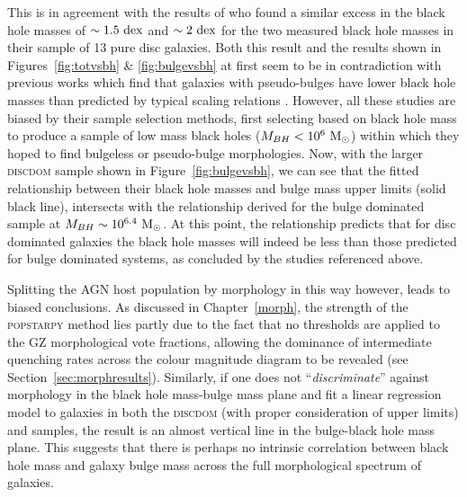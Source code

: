 {This is in agreement with the results of \citet{Simmons13} who found a similar excess in the black hole masses of $\sim 1.5~\rm{dex}$ and $\sim 2~\rm{dex}$ for the two measured black hole masses in their sample of 13 pure disc galaxies. Both this result and the results shown in Figures~\ref{fig:totvsbh} \& \ref{fig:bulgevsbh} at first seem to be in contradiction with previous works which find that galaxies with pseudo-bulges have lower black hole masses than predicted by typical scaling relations \citep[see work by][]{greene08, hu09, jiang11a, mathur12, ho14}. However, all these studies are biased by their sample selection methods, first selecting based on black hole mass to produce a sample of low mass black holes ($M_{BH} < 10^6 ~\rm{M}_{\odot}$) within which they hoped to find bulgeless or pseudo-bulge morphologies. Now, with the larger \textsc{discdom} sample shown in Figure~\ref{fig:bulgevsbh}, we can see that the fitted relationship between their black hole masses and bulge mass upper limits (solid black line), intersects with the relationship derived for the bulge dominated \citet{haringrix04} sample at $M_{BH} \sim 10^{6.4} ~\rm{M}_{\odot}$. At this point, the relationship predicts that for disc dominated galaxies the black hole masses will indeed be less than those predicted for bulge dominated systems, as concluded by the studies referenced above. 

Splitting the AGN host population by morphology in this way however, leads to biased conclusions. As discussed in Chapter~\ref{morph}, the strength of the \textsc{popstarpy} method lies partly due to the fact that no thresholds are applied to the GZ morphological vote fractions, allowing the dominance of intermediate quenching rates across the colour magnitude diagram to be revealed (see Section~\ref{sec:morphresults}). Similarly, if one does not ``\emph{discriminate}'' against morphology in the black hole mass-bulge mass plane and fit a linear regression model to galaxies in both the \textsc{discdom} (with proper consideration of upper limits) and \citet{haringrix04} samples, the result is an almost vertical line in the bulge-black hole mass plane. This suggests that there is perhaps no intrinsic correlation between black hole mass and galaxy bulge mass across the full morphological spectrum of galaxies. 

}
